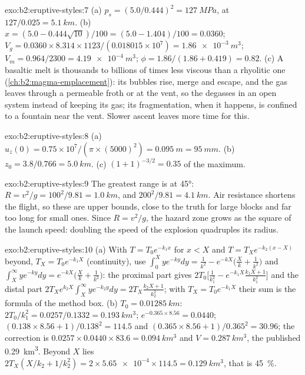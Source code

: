 \begin{solution}{exo:b2:eruptive-styles:7}
(a) $p_s = (5.0/0.444)^2 = \qty{127}{MPa}$, at $127/0.025 = \qty{5.1}{km}$.
(b) $x = (5.0 - 0.444\sqrt{10})/100 = (5.0 - 1.404)/100 = 0.0360$;
$V_g = 0.0360\times8.314\times1123/(0.018015\times10^7) = \qty{1.86e-3}{m^3}$;
$V_m = 0.964/2300 = \qty{4.19e-4}{m^3}$; $\phi = 1.86/(1.86 + 0.419) = 0.82$.
(c) A basaltic melt is thousands to billions of times less viscous than a
rhyolitic one (\cref{ch:b2:magma-emplacement}): its bubbles rise,
merge and escape, and the gas leaves through a permeable froth or at the
vent, so the  degasses in an open system instead of keeping its gas; its
fragmentation, when it happens, is confined to a fountain near the vent. Slower
ascent leaves more time for this.
\end{solution}

\begin{solution}{exo:b2:eruptive-styles:8}
(a) $u_z(0) = 0.75\times10^7/(\pi\times(5000)^2) = \qty{0.095}{m} = \qty{95}{mm}$.
(b) $z_0 = 3.8/0.766 = \qty{5.0}{km}$. (c) $(1 + 1)^{-3/2} = 0.35$ of the
maximum.
\end{solution}

\begin{solution}{exo:b2:eruptive-styles:9}
The greatest range is at \ang{45}: $R = v^2/g = 100^2/9.81 = \qty{1.0}{km}$, and
$200^2/9.81 = \qty{4.1}{km}$. Air resistance shortens the flight, so these are
upper bounds, close to the truth for large blocks and far too long for small ones.
Since $R = v^2/g$, the hazard zone grows as the square of the launch speed:
doubling the speed of the explosion quadruples its radius.
\end{solution}

\begin{solution}{exo:b2:eruptive-styles:10}
(a) With $T = T_0e^{-k_1x}$ for $x < X$ and $T = T_Xe^{-k_2(x - X)}$ beyond, $T_X =
T_0e^{-k_1X}$ (continuity), use $\int_0^X ye^{-ky}dy = \frac{1}{k^2} - e^{-kX}\big(\frac{X}{k} +
\frac{1}{k^2}\big)$ and $\int_X^\infty ye^{-ky}dy = e^{-kX}\big(\frac{X}{k} +
\frac{1}{k^2}\big)$:
the proximal part gives $2T_0\big[\frac{1}{k_1^2} - e^{-k_1X}\frac{k_1X + 1}{k_1^2}\big]$ and the
distal part $2T_Xe^{k_2X}\int_X^\infty ye^{-k_2y}dy = 2T_X\frac{k_2X + 1}{k_2^2}$; with $T_X =
T_0e^{-k_1X}$ their sum is the formula of the method box.
(b) $T_0 = \qty{0.01285}{km}$: $2T_0/k_1^2 = 0.0257/0.1332 = \qty{0.193}{km^3}$;
$e^{-0.365\times8.56} = 0.0440$; $(0.138\times8.56 + 1)/0.138^2 = 114.5$ and
$(0.365\times8.56 + 1)/0.365^2 = 30.96$; the correction is $0.0257\times0.0440\times83.6
= \qty{0.094}{km^3}$ and $V = \qty{0.287}{km^3}$, the published \qty{0.29}{km^3}.
Beyond $X$ lies $2T_X(X/k_2 + 1/k_2^2) = 2\times\num{5.65e-4}\times114.5 =
\qty{0.129}{km^3}$, that is \qty{45}{\percent}.
\end{solution}

